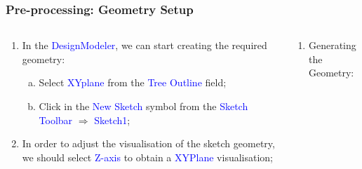 \documentclass[10pt,compress, unknownkeysallowed]{beamer}
\newcommand{\blue}{\textcolor{blue}}
\begin{document}
\begin{frame}
 \frametitle{Pre-processing: Geometry Setup} 
    \begin{columns}
       \begin{column}[l]{0.5\linewidth}
          \begin{enumerate}[1)]\scriptsize\setcounter{enumi}{2}
             \item<1-> In the \blue{DesignModeler}, we can start creating the required geometry:
                 \begin{enumerate}[a)]\scriptsize
                    \item<1-> Select \blue{XYplane} from the \blue{Tree Outline} field;
                    \item<1-> Click in the \blue{New Sketch} symbol from the \blue{Sketch Toolbar} $\Rightarrow$ \blue{Sketch1};
                 \end{enumerate}
             \item<2-> In order to adjust the visualisation of the sketch geometry, we should select \blue{Z-axis} to obtain a \blue{XYPlane} visualisation;
          \end{enumerate}
          \begin{center}
          \end{center}
       \end{column}
       \begin{column}[l]{0.5\linewidth}
          \begin{enumerate}[1)]\scriptsize\setcounter{enumi}{4} 
             \item<3-> Generating the Geometry:
                 \begin{enumerate}[a)]\scriptsize

\end{enumerate}
\end{enumerate}
\end{column}
\end{columns}
\end{frame}
\end{document}

